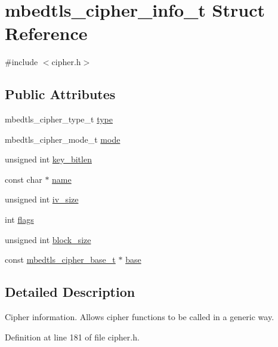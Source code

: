 \hypertarget{structmbedtls__cipher__info__t}{\section{mbedtls\-\_\-cipher\-\_\-info\-\_\-t Struct Reference}
\label{structmbedtls__cipher__info__t}
}


{\ttfamily \#include $<$cipher.\-h$>$}

\subsection*{Public Attributes}
\begin{DoxyCompactItemize}
\item 
mbedtls\-\_\-cipher\-\_\-type\-\_\-t \hyperlink{structmbedtls__cipher__info__t_a399f289efa81ca0da63bc80686b5fe82}{type}
\item 
mbedtls\-\_\-cipher\-\_\-mode\-\_\-t \hyperlink{structmbedtls__cipher__info__t_a6603375900f4834ae6c91e305aef34f6}{mode}
\item 
unsigned int \hyperlink{structmbedtls__cipher__info__t_a21ac3fc6bf536ce16f1754301e7fe3c9}{key\-\_\-bitlen}
\item 
const char $\ast$ \hyperlink{structmbedtls__cipher__info__t_a7e79a9fb2bd143cc08d59b89b86c9ed7}{name}
\item 
unsigned int \hyperlink{structmbedtls__cipher__info__t_a3416bc1e18e1694da17bc922f152b20d}{iv\-\_\-size}
\item 
int \hyperlink{structmbedtls__cipher__info__t_af0aa5e7fedfd8a85434ec43691d890d8}{flags}
\item 
unsigned int \hyperlink{structmbedtls__cipher__info__t_a7be9560c375110a1d829407e74ab698f}{block\-\_\-size}
\item 
const \hyperlink{structmbedtls__cipher__base__t}{mbedtls\-\_\-cipher\-\_\-base\-\_\-t} $\ast$ \hyperlink{structmbedtls__cipher__info__t_ab49e136926e04b02806503deb8844f2d}{base}
\end{DoxyCompactItemize}


\subsection{Detailed Description}
Cipher information. Allows cipher functions to be called in a generic way. 

Definition at line 181 of file cipher.\-h.



